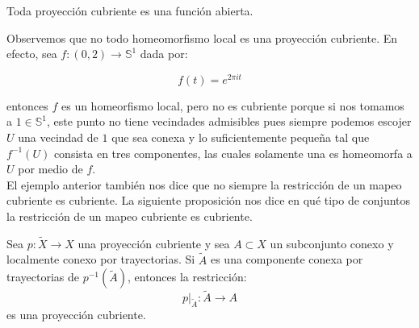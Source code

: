 \begin{corollary}
Toda proyecci\'on cubriente es una funci\'on abierta.\\
\end{corollary}


Observemos que no todo homeomorfismo local es una proyecci\'on cubriente. En efecto, sea $f:(0,2) \rightarrow \mathbb S^1$ dada por:

$$ f(t)= e^{2 \pi i t}$$

entonces $f$ es un homeorfismo local, pero no es cubriente porque si nos tomamos a $1 \in \mathbb S^1$, este punto no tiene vecindades admisibles pues siempre podemos escojer $U$ una vecindad de $1$ que sea conexa y lo suficientemente peque\~na tal que $f^{-1}(U)$ consista en tres componentes, las cuales solamente una es homeomorfa a $U$ por medio de $f$.\\ 


El ejemplo anterior tambi\'en nos dice que no siempre la restricci\'on de un mapeo cubriente es cubriente. La siguiente proposici\'on nos dice en qu\'e tipo de conjuntos la restricci\'on de un mapeo cubriente es cubriente.


\begin{proposition}\label{SubProyCub}

Sea $p: \widetilde{X} \rightarrow X$ una proyecci\'on cubriente y sea $A \subset X$ un subconjunto conexo y localmente conexo por trayectorias. Si $\widetilde{A}$ es una componente conexa por trayectorias de $p^{-1}(\widetilde{A})$, entonces la restricci\'on: 
$$p \vert_{\widetilde{A}}:\widetilde{A} \rightarrow A$$ 
es una proyecci\'on cubriente.\\

\end{proposition}

